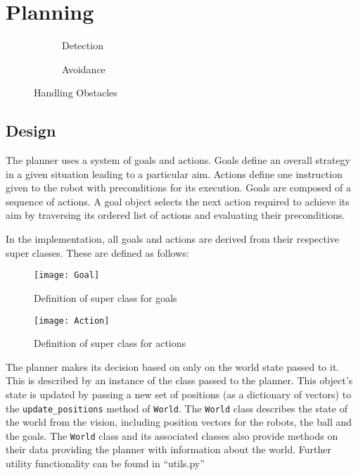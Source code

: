\section{Planning}
\lstset{language=Python, showstringspaces=false}


\begin{figure}[H]
\centering
\begin{subfigure}{.5\textwidth}
\centering

\caption{Detection}
\label{fig:obstacle_detection}
\end{subfigure}%
\begin{subfigure}{.5\textwidth}
\centering

\caption{Avoidance}
\label{fig:obstacle_avoidance}
\end{subfigure}
\caption{Handling Obstacles}
\label{handling_obstacle}
\end{figure}



\subsection{Design}

The planner uses a system of goals and actions. Goals define an overall strategy in a given situation leading to a particular aim. Actions define one instruction given to the robot with preconditions for its execution. Goals are composed of a sequence of actions. A goal object selects the next action required to achieve its aim by traversing its ordered list of actions and evaluating their preconditions.

In the implementation, all goals and actions are derived from their respective super classes. These are defined as follows:

\begin{figure}[H]
	\centering
    \texttt{[image: Goal]}
    \caption{Definition of super class for goals}
\end{figure}


\begin{figure}[H]
	\centering
    \texttt{[image: Action]}
    \caption{Definition of super class for actions}
\end{figure}


The planner makes its decision based on only on the world state passed to it. This is described by an instance of the  class passed to the planner. This object's state is updated by passing a new set of positions (as a dictionary of vectors) to the \texttt{update\_positions} method of \texttt{World}. The \texttt{World} class describes the state of the world from the vision, including position vectors for the robots, the ball and the goals. The \texttt{World} class and its associated classes also provide methods on their data providing the planner with information about the world. Further utility functionality can be found in ``utils.py''

